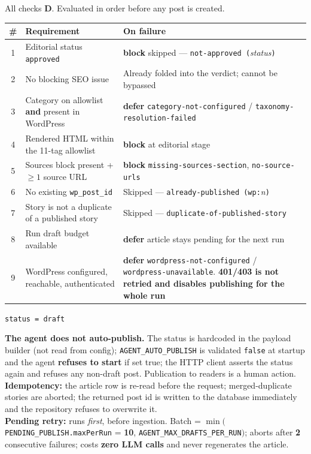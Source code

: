 \documentclass[10pt,a4paper]{article}
\newcommand{\vr}[1]{\texttt{\footnotesize\hyphenpenalty=0\exhyphenpenalty=0\relax #1}}
\newcommand{\cd}[1]{\texttt{\footnotesize\hyphenpenalty=0\exhyphenpenalty=0\relax #1}}
\newcommand{\us}{\_\discretionary{}{}{}}
\newcommand{\D}{\textcolor{go}{\textbf{D}}}
\newcommand{\BL}{\textcolor{st}{\textbf{block}}}
\newcommand{\DF}{\textcolor{hd}{\textbf{defer}}}
\begin{document}
All checks \D. Evaluated in order before any post is created.

\begin{center}\footnotesize
\begin{tabularx}{\textwidth}{@{}c >{\RaggedRight}p{4.2cm} >{\RaggedRight}X@{}}
\toprule
\textbf{\#} & \textbf{Requirement} & \textbf{On failure} \\
\midrule
1 & Editorial status \cd{approved} & \BL{} skipped --- \cd{not-approved (}\textit{status}\cd{)} \\
2 & No blocking SEO issue & Already folded into the verdict; cannot be bypassed \\
3 & Category on allowlist \textbf{and} present in WordPress & \DF{} \cd{category-not-configured} / \cd{taxonomy-resolution-failed} \\
4 & Rendered HTML within the 11-tag allowlist & \BL{} at editorial stage \\
5 & Sources block present + $\geq 1$ source URL & \BL{} \cd{missing-sources-section}, \cd{no-source-urls} \\
6 & No existing \cd{wp\us post\us id} & Skipped --- \cd{already-published (wp:}\textit{n}\cd{)} \\
7 & Story is not a duplicate of a published story & Skipped --- \cd{duplicate-of-}\allowbreak\cd{published-story} \\
8 & Run draft budget available & \DF{} article stays pending for the next run \\
9 & WordPress configured, reachable, authenticated & \DF{} \cd{wordpress-}\allowbreak\cd{not-configured} / \cd{wordpress-unavailable}. \textbf{401/403 is not retried and disables publishing for the whole run} \\
\bottomrule
\end{tabularx}
\end{center}

\begin{warn}\footnotesize
\begin{center}\cd{status = draft}\end{center}
\vspace{-0.4em}
\textbf{The agent does not auto-publish.} The status is hardcoded in the payload builder (not read from config); \vr{AGENT\us AUTO\us PUBLISH} is validated \cd{false} at startup and the agent \textbf{refuses to start} if set true; the HTTP client asserts the status again and refuses any non-draft post. Publication to readers is a human action.\\[0.25em]
\textbf{Idempotency:} the article row is re-read before the request; merged-duplicate stories are aborted; the returned post id is written to the database immediately and the repository refuses to overwrite it.\\[0.25em]
\textbf{Pending retry:} runs \emph{first}, before ingestion. Batch = $\min($\cd{PENDING\us PUBLISH.maxPerRun} = \textbf{10}, \vr{AGENT\us MAX\us DRAFTS\us PER\us RUN}$)$; aborts after \textbf{2} consecutive failures; costs \textbf{zero LLM calls} and never regenerates the article.
\end{warn}
\end{document}
